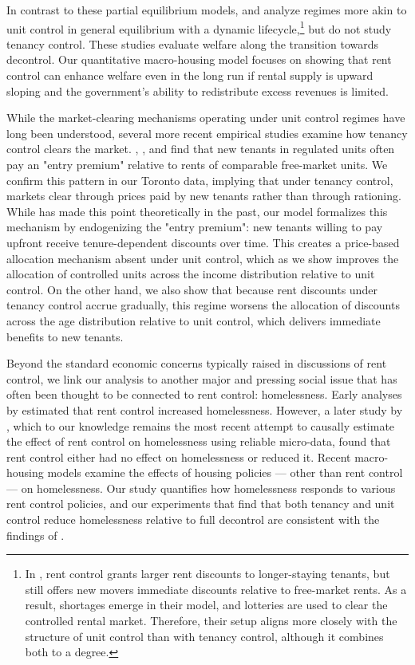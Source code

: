 \documentclass[parskip=full]{article}
\begin{document}
In contrast to these partial equilibrium models, \citet{eric-1995} and \citet{fmn-2023} analyze regimes more akin to unit control in general equilibrium with a dynamic lifecycle,\footnote{In \citet{fmn-2023}, rent control grants larger rent discounts to longer-staying tenants, but still offers new movers immediate discounts relative to free-market rents. As a result, shortages emerge in their model, and lotteries are used to clear the controlled rental market. Therefore, their setup aligns more closely with the structure of unit control than with tenancy control, although it combines both to a degree.} but do not study tenancy control. These studies evaluate welfare along the transition towards decontrol. Our quantitative macro-housing model focuses on showing that rent control can enhance welfare even in the long run if rental supply is upward sloping and the government’s ability to redistribute excess revenues is limited.

While the market-clearing mechanisms operating under unit control regimes have long been understood, several more recent empirical studies examine how tenancy control clears the market. \citet{nagy-1997}, \citet{early-2000}, and \citet{cjq-2023} find that new tenants in regulated units often pay an "entry premium" relative to rents of comparable free-market units. We confirm this pattern in our Toronto data, implying that under tenancy control, markets clear through prices paid by new tenants rather than through rationing. While \citet{arnott-1995} has made this point theoretically in the past, our model formalizes this mechanism by endogenizing the "entry premium": new tenants willing to pay upfront receive tenure-dependent discounts over time. This creates a price-based allocation mechanism absent under unit control, which as we show improves the allocation of controlled units across the income distribution relative to unit control. On the other hand, we also show that because rent discounts under tenancy control accrue gradually, this regime worsens the allocation of discounts across the age distribution relative to unit control, which delivers immediate benefits to new tenants.

Beyond the standard economic concerns typically raised in discussions of rent control, we link our analysis to another major and pressing social issue that has often been thought to be connected to rent control: homelessness. Early analyses by \citet{tucker1987,tucker1989heritage,tucker1991cato,tucker1991public} estimated that rent control increased homelessness. However, a later study by \citet{eo-1998}, which to our knowledge remains the most recent attempt to causally estimate the effect of rent control on homelessness using reliable micro-data, found that rent control either had no effect on homelessness or reduced it. Recent macro-housing models \citep{az-2024, abramson-2024} examine the effects of housing policies — other than rent control — on homelessness. Our study quantifies how homelessness responds to various rent control policies, and our experiments that find that both tenancy and unit control reduce homelessness relative to full decontrol are consistent with the findings of \citet{eo-1998}. 
\end{document}

